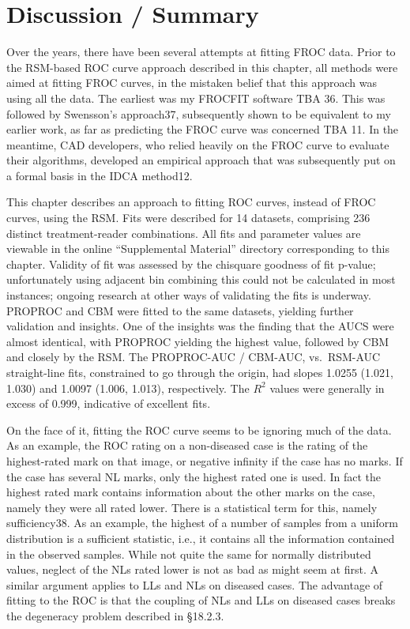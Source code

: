 \documentclass[
]{book}
\begin{document}
\hypertarget{rsm-3-fits-discussion-summary}{%
\section{Discussion / Summary}\label{rsm-3-fits-discussion-summary}}

Over the years, there have been several attempts at fitting FROC data. Prior to the RSM-based ROC curve approach described in this chapter, all methods were aimed at fitting FROC curves, in the mistaken belief that this approach was using all the data. The earliest was my FROCFIT software TBA 36. This was followed by Swensson's approach37, subsequently shown to be equivalent to my earlier work, as far as predicting the FROC curve was concerned TBA 11. In the meantime, CAD developers, who relied heavily on the FROC curve to evaluate their algorithms, developed an empirical approach that was subsequently put on a formal basis in the IDCA method12.

This chapter describes an approach to fitting ROC curves, instead of FROC curves, using the RSM. Fits were described for 14 datasets, comprising 236 distinct treatment-reader combinations. All fits and parameter values are viewable in the online ``Supplemental Material'' directory corresponding to this chapter. Validity of fit was assessed by the chisquare goodness of fit p-value; unfortunately using adjacent bin combining this could not be calculated in most instances; ongoing research at other ways of validating the fits is underway. PROPROC and CBM were fitted to the same datasets, yielding further validation and insights. One of the insights was the finding that the AUCS were almost identical, with PROPROC yielding the highest value, followed by CBM and closely by the RSM. The PROPROC-AUC / CBM-AUC, vs.~RSM-AUC straight-line fits, constrained to go through the origin, had slopes 1.0255 (1.021, 1.030) and 1.0097 (1.006, 1.013), respectively. The \(R^2\) values were generally in excess of 0.999, indicative of excellent fits.

On the face of it, fitting the ROC curve seems to be ignoring much of the data. As an example, the ROC rating on a non-diseased case is the rating of the highest-rated mark on that image, or negative infinity if the case has no marks. If the case has several NL marks, only the highest rated one is used. In fact the highest rated mark contains information about the other marks on the case, namely they were all rated lower. There is a statistical term for this, namely sufficiency38. As an example, the highest of a number of samples from a uniform distribution is a sufficient statistic, i.e., it contains all the information contained in the observed samples. While not quite the same for normally distributed values, neglect of the NLs rated lower is not as bad as might seem at first. A similar argument applies to LLs and NLs on diseased cases. The advantage of fitting to the ROC is that the coupling of NLs and LLs on diseased cases breaks the degeneracy problem described in §18.2.3.
\end{document}
